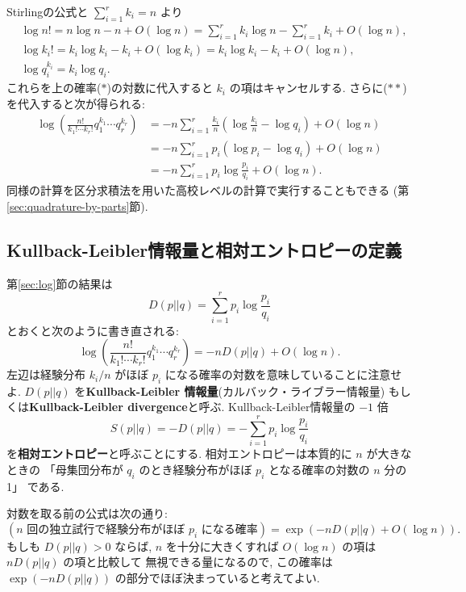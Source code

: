 \documentclass[12pt,twoside]{jarticle}
\theoremstyle{definition} %
\theoremstyle{definition} %
\theoremstyle{definition} %
\numberwithin{theorem}{section}
\numberwithin{equation}{section}
\numberwithin{figure}{section}
\numberwithin{table}{section}
\newcommand\secref[1]{第\ref{#1}節}
\begin{document}
Stirlingの公式と $\sum_{i=1}^r k_i=n$ より
\begin{align*}
&
\log n! 
= n\log n - n + O(\log n)
= \sum_{i=1}^r k_i\log n - \sum_{i=1}^r k_i + O(\log n), 
\\ &
\log k_i! 
= k_i\log k_i - k_i + O(\log k_i) 
= k_i\log k_i - k_i + O(\log n),
\\ &
\log q_i^{k_i} = k_i\log q_i.
\end{align*}
これらを上の確率($*$)の対数に代入すると $k_i$ の項はキャンセルする.
さらに($**$)を代入すると次が得られる:
\begin{align*}
\log\left(\frac{n!}{k_1!\cdots k_r!} q_1^{k_1}\cdots q_r^{k_r}\right)
&
=
- n\sum_{i=1}^r \frac{k_i}{n}\left(\log\frac{k_i}{n}-\log q_i\right) 
+ O(\log n)
\\ &
= -n\sum_{i=1}^r p_i(\log p_i - \log q_i)+O(\log n)
\\ &
= -n\sum_{i=1}^r p_i\log\frac{p_i}{q_i}+O(\log n).
\end{align*}
同様の計算を区分求積法を用いた高校レベルの計算で実行することもできる
(\secref{sec:quadrature-by-parts}).



\subsection{Kullback-Leibler情報量と相対エントロピーの定義}

\secref{sec:log}の結果は
\[
D(p||q)=\sum_{i=1}^r p_i\log\frac{p_i}{q_i}
\]
とおくと次のように書き直される:
\[
\log\left(\frac{n!}{k_1!\cdots k_r!} q_1^{k_1}\cdots q_r^{k_r}\right)
=-n D(p||q) + O(\log n).
\]
左辺は経験分布 $k_i/n$ がほぼ $p_i$ になる確率の対数を意味していることに注意せよ.
$D(p||q)$ を{\bf Kullback-Leibler 情報量}(カルバック・ライブラー情報量)
もしくは{\bf Kullback-Leibler divergence}と呼ぶ.
Kullback-Leibler情報量の $-1$ 倍
\[
S(p||q) = -D(p||q) = - \sum_{i=1}^r p_i\log\frac{p_i}{q_i}
\]
を{\bf 相対エントロピー}と呼ぶことにする.
相対エントロピーは本質的に $n$ が大きなときの
「母集団分布が $q_i$ のとき経験分布がほぼ $p_i$ となる確率の対数の $n$ 分の1」
である.

対数を取る前の公式は次の通り:
\[
(\text{$n$ 回の独立試行で経験分布がほぼ $p_i$ になる確率})
=\exp(-n D(p||q) + O(\log n)).
\]
もしも $D(p||q)>0$ ならば,  
$n$ を十分に大きくすれば $O(\log n)$ の項は $n D(p||q)$ の項と比較して
無視できる量になるので, 
この確率は $\exp(-n D(p||q))$ の部分でほぼ決まっていると考えてよい. 

\end{document}

